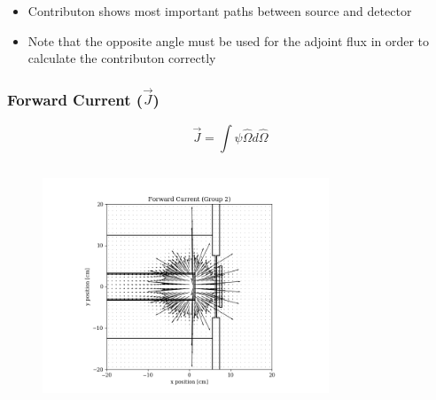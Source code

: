 \documentclass[t]{beamer}
\begin{document}
\begin{frame}
\begin{columns}
\begin{figure}
    \end{figure}
  \end{columns}
  \begin{itemize}
    \item Contributon shows most important paths between source and detector
    \item Note that the opposite angle must be used for the adjoint flux in order to calculate the contributon correctly
  \end{itemize}
\end{frame}

\begin{frame}
  \frametitle{Forward Current ($\vec{J}$)}
  \vskip-0.25in
  \begin{equation}
    \vec{J} = \int\psi\hat{\Omega}d\hat{\Omega}
  \end{equation}
  \vskip-0.25in
  \begin{columns}
    \begin{figure}
      \includegraphics[trim={0.7in 0.15in 1.05in 0.4in},clip,scale=0.36]{images/current_fwd_g02.png}
    \end{figure}
    \begin{figure}

\end{figure}
\end{columns}
\end{frame}
\end{document}
